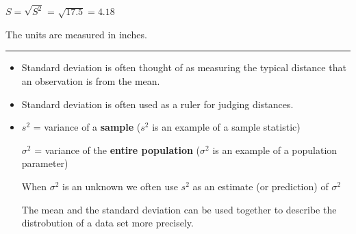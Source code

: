 \documentclass{report}
\begin{document}
 $S = \sqrt{S^2}$ = $\sqrt{17.5} = 4.18$
\vspace{3mm}

 The units are measured in inches.

\bigbreak \noindent
\hrule
\bigbreak \noindent
{}
\bigbreak \noindent
\begin{itemize}
  \item Standard deviation is often thought of as measuring the typical distance that an observation is from the mean.
  \item Standard deviation is often used as a ruler for judging distances.
    \vspace{3mm}

  \item $s^2$ = variance of a \textbf{sample} \hspace{27mm} ($s^2$ is an example of a sample statistic)
    \vspace{2mm}

    $\sigma^2$ = variance of the \textbf{entire population} \hspace{5mm}  ($\sigma^2$ is an example of a population parameter)
    \vspace{3mm}

    When $\sigma^2$ is an unknown we often use $s^2$ as an estimate (or prediction) of $\sigma^2$
    \vspace{3mm}

    The mean and the standard deviation can be used together to describe the distrobution of a data set more precisely.
\end{itemize}
    \bigbreak \noindent
\end{document}
